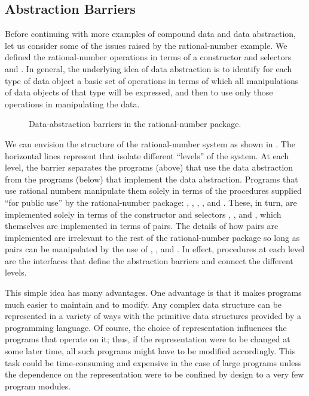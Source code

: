 \subsection{Abstraction Barriers}
\label{Section 2.1.2}

Before continuing with more examples of compound data and data abstraction, let us consider some of the issues raised by the rational-number example.
We defined the rational-number operations in terms of a constructor  and selectors  and .
In general, the underlying idea of data abstraction is to identify for each type of data object a basic set of operations in terms of which all manipulations of data objects of that type will be expressed, and then to use only those operations in manipulating the data.

\begin{figure}[tb]
	\centering
	
	\caption{
		Data-abstraction barriers in the rational-number package.
	}
	\label{Figure 2.1}
\end{figure}

We can envision the structure of the rational-number system as shown in .
The horizontal lines represent  that isolate different “levels” of the system.
At each level, the barrier separates the programs (above) that use the data abstraction from the programs (below) that implement the data abstraction.
Programs that use rational numbers manipulate them solely in terms of the procedures supplied “for public use” by the rational-number package:
, , , , and .
These, in turn, are implemented solely in terms of the constructor and selectors , , and , which themselves are implemented in terms of pairs.
The details of how pairs are implemented are irrelevant to the rest of the rational-number package so long as pairs can be manipulated by the use of , , and .
In effect, procedures at each level are the interfaces that define the abstraction barriers and connect the different levels.

This simple idea has many advantages.
One advantage is that it makes programs much easier to maintain and to modify.
Any complex data structure can be represented in a variety of ways with the primitive data structures provided by a programming language.
Of course, the choice of representation influences the programs that operate on it;
thus, if the representation were to be changed at some later time, all such programs might have to be modified accordingly.
This task could be time-consuming and expensive in the case of large programs unless the dependence on the representation were to be confined by design to a very few program modules.

